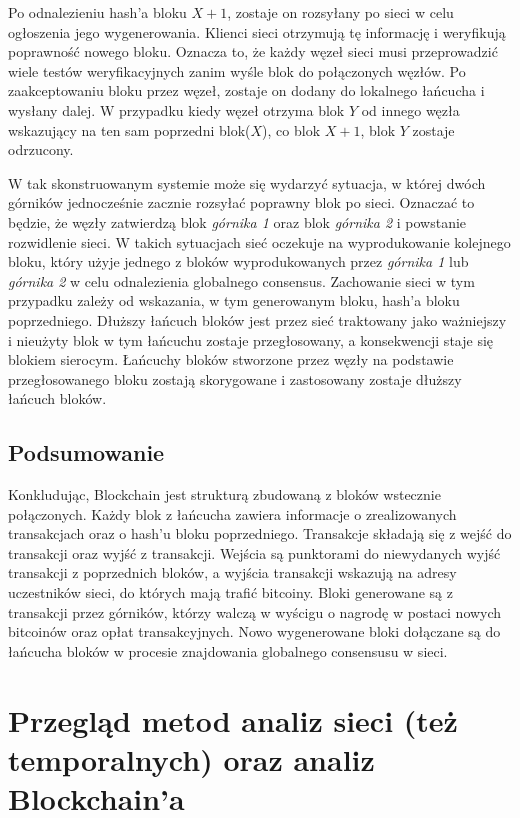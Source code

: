 \documentclass[12pt, twoside, final, openany]{mgr}
\begin{document}
\indent Po odnalezieniu hash'a bloku $X+1$, zostaje on rozsyłany po sieci w celu ogłoszenia jego wygenerowania. Klienci sieci otrzymują tę informację i weryfikują poprawność nowego bloku. Oznacza to, że każdy węzeł sieci musi przeprowadzić wiele testów weryfikacyjnych zanim wyśle blok do połączonych węzłów. Po zaakceptowaniu bloku przez węzeł, zostaje on dodany do lokalnego łańcucha i wysłany dalej. W przypadku kiedy węzeł otrzyma blok $Y$ od innego węzła wskazujący na ten sam poprzedni blok($X$), co blok $X+1$, blok $Y$ zostaje odrzucony.

\indent W tak skonstruowanym systemie może się wydarzyć sytuacja, w której dwóch górników jednocześnie zacznie rozsyłać poprawny blok po sieci. Oznaczać to będzie, że węzły zatwierdzą blok \textit{górnika 1} oraz blok \textit{górnika 2} i powstanie rozwidlenie sieci. W takich sytuacjach sieć oczekuje na wyprodukowanie kolejnego bloku, który użyje jednego z bloków wyprodukowanych przez \textit{górnika 1} lub \textit{górnika 2} w celu odnalezienia globalnego consensus. Zachowanie sieci w tym przypadku zależy od wskazania, w tym generowanym bloku, hash'a bloku poprzedniego. Dłuższy łańcuch bloków jest przez sieć traktowany jako ważniejszy i nieużyty blok w tym łańcuchu zostaje przegłosowany, a konsekwencji staje się blokiem sierocym. Łańcuchy bloków stworzone przez węzły na podstawie przegłosowanego bloku zostają skorygowane i zastosowany zostaje dłuższy łańcuch bloków.

\section{Podsumowanie}

\indent Konkludując, Blockchain jest strukturą zbudowaną z bloków wstecznie połączonych. Każdy blok z łańcucha zawiera informacje o zrealizowanych transakcjach oraz o hash'u bloku poprzedniego. Transakcje składają się z wejść do transakcji oraz wyjść z transakcji. Wejścia są punktorami do niewydanych wyjść transakcji z poprzednich bloków, a wyjścia transakcji wskazują na adresy uczestników sieci, do których mają trafić bitcoiny. Bloki generowane są z transakcji przez górników, którzy walczą w wyścigu o nagrodę w postaci nowych bitcoinów oraz opłat transakcyjnych. Nowo wygenerowane bloki dołączane są do łańcucha bloków w procesie znajdowania globalnego consensusu w sieci.

\chapter{Przegląd metod analiz sieci (też temporalnych) oraz analiz Blockchain'a}
\label{przegladAnalizy}
\end{document}
